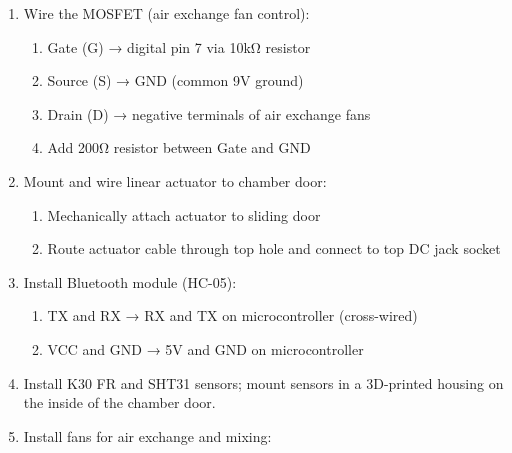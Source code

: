 \documentclass[
  11pt,
  letterpaper,
]{book}
\providecommand{\tightlist}{%
  \setlength{\itemsep}{0pt}\setlength{\parskip}{0pt}}
\begin{document}
\begin{enumerate}
  \begin{enumerate}
  \def\labelenumii{\alph{enumii}.}
  \tightlist
  \item
    IN+ and IN− → 9V input from bottom DC jack\\
  \item
    OUT+ and OUT− → COM1 and COM2 on relay (to power actuator)
  \end{enumerate}
\item
  Wire the MOSFET (air exchange fan control):

  \begin{enumerate}
  \def\labelenumii{\alph{enumii}.}
  \tightlist
  \item
    Gate (G) → digital pin 7 via 10kΩ resistor\\
  \item
    Source (S) → GND (common 9V ground)\\
  \item
    Drain (D) → negative terminals of air exchange fans\\
  \item
    Add 200Ω resistor between Gate and GND
  \end{enumerate}
\item
  Mount and wire linear actuator to chamber door:

  \begin{enumerate}
  \def\labelenumii{\alph{enumii}.}
  \tightlist
  \item
    Mechanically attach actuator to sliding door\\
  \item
    Route actuator cable through top hole and connect to top DC jack
    socket
  \end{enumerate}
\item
  Install Bluetooth module (HC-05):

  \begin{enumerate}
  \def\labelenumii{\alph{enumii}.}
  \tightlist
  \item
    TX and RX → RX and TX on microcontroller (cross-wired)\\
  \item
    VCC and GND → 5V and GND on microcontroller
  \end{enumerate}
\item
  Install K30 FR and SHT31 sensors; mount sensors in a 3D-printed
  housing on the inside of the chamber door.
\item
  Install fans for air exchange and mixing:


\end{enumerate}
\end{document}
